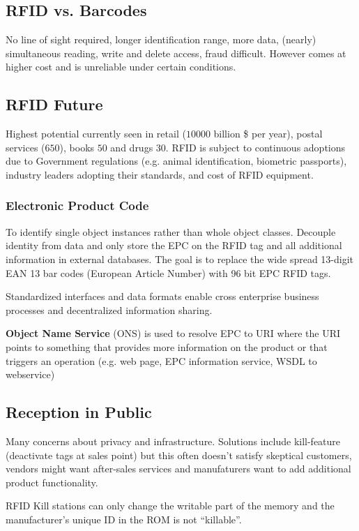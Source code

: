 \documentclass{article}
\begin{document}
\begin{multicols}{2}
\subsection{RFID vs. Barcodes}
No line of sight required, longer identification range, more data, (nearly)
simultaneous reading, write and delete access, fraud difficult. However comes at
higher cost and is unreliable under certain conditions.

\subsection{RFID Future}
Highest potential currently seen in retail ($10000$ billion \$ per year), postal
services ($650$), books $50$ and drugs $30$. RFID is subject to continuous
adoptions due to Government regulations (e.g. animal identification, biometric
passports), industry leaders adopting their standards, and cost of RFID
equipment.

\subsubsection{Electronic Product Code}
To identify single object instances rather than whole object classes. Decouple
identity from data and only store the EPC on the RFID tag and all additional
information in external databases. The goal is to replace the wide spread
13-digit EAN 13 bar codes (European Article Number) with 96 bit EPC RFID tags.

Standardized interfaces and data formats enable cross enterprise business
processes and decentralized information sharing.

{\bf Object Name Service} (ONS) is used to resolve EPC to URI where the URI
points to something that provides more information on the product or that
triggers an operation (e.g. web page, EPC information service, WSDL to
webservice)

\subsection{Reception in Public}
Many concerns about privacy and infrastructure. Solutions include kill-feature
(deactivate tags at sales point) but this often doesn't satisfy skeptical
customers, vendors might want after-sales services and manufaturers want to add
additional product functionality.

RFID Kill stations can only change the writable part of the memory and the
manufacturer's unique ID in the ROM is not ``killable''.


\end{multicols}
\end{document}
